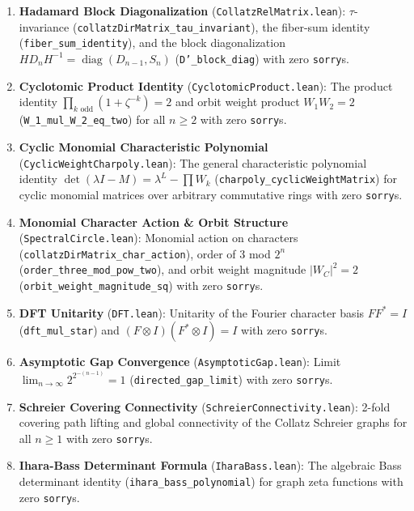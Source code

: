 \documentclass[11pt,reqno]{amsart}
\theoremstyle{definition}
\begin{document}
\begin{enumerate}
\item \textbf{Hadamard Block Diagonalization} (\texttt{CollatzRelMatrix.lean}): $\tau$-invariance (\texttt{collatzDirMatrix\_tau\_invariant}), the fiber-sum identity (\texttt{fiber\_sum\_identity}), and the block diagonalization $H D_n H^{-1} = \operatorname{diag}(D_{n-1}, S_n)$ (\texttt{D'\_block\_diag}) with zero \texttt{sorry}s.
\item \textbf{Cyclotomic Product Identity} (\texttt{CyclotomicProduct.lean}): The product identity $\prod_{k \text{ odd}} (1 + \zeta^{-k}) = 2$ and orbit weight product $W_1 W_2 = 2$ (\texttt{W\_1\_mul\_W\_2\_eq\_two}) for all $n \ge 2$ with zero \texttt{sorry}s.
\item \textbf{Cyclic Monomial Characteristic Polynomial} (\texttt{CyclicWeightCharpoly.lean}): The general characteristic polynomial identity $\det(\lambda I - M) = \lambda^L - \prod W_k$ (\texttt{charpoly\_cyclicWeightMatrix}) for cyclic monomial matrices over arbitrary commutative rings with zero \texttt{sorry}s.
\item \textbf{Monomial Character Action \& Orbit Structure} (\texttt{SpectralCircle.lean}): Monomial action on characters (\texttt{collatzDirMatrix\_char\_action}), order of 3 mod $2^n$ (\texttt{order\_three\_mod\_pow\_two}), and orbit weight magnitude $|W_C|^2 = 2$ (\texttt{orbit\_weight\_magnitude\_sq}) with zero \texttt{sorry}s.
\item \textbf{DFT Unitarity} (\texttt{DFT.lean}): Unitarity of the Fourier character basis $F F^* = I$ (\texttt{dft\_mul\_star}) and $(F \otimes I)(F^* \otimes I) = I$ with zero \texttt{sorry}s.
\item \textbf{Asymptotic Gap Convergence} (\texttt{AsymptoticGap.lean}): Limit $\lim_{n \to \infty} 2^{2^{-(n-1)}} = 1$ (\texttt{directed\_gap_limit}) with zero \texttt{sorry}s.
\item \textbf{Schreier Covering Connectivity} (\texttt{SchreierConnectivity.lean}): 2-fold covering path lifting and global connectivity of the Collatz Schreier graphs for all $n \ge 1$ with zero \texttt{sorry}s.
\item \textbf{Ihara-Bass Determinant Formula} (\texttt{IharaBass.lean}): The algebraic Bass determinant identity (\texttt{ihara\_bass\_polynomial}) for graph zeta functions with zero \texttt{sorry}s.
\end{enumerate}

\end{document}
